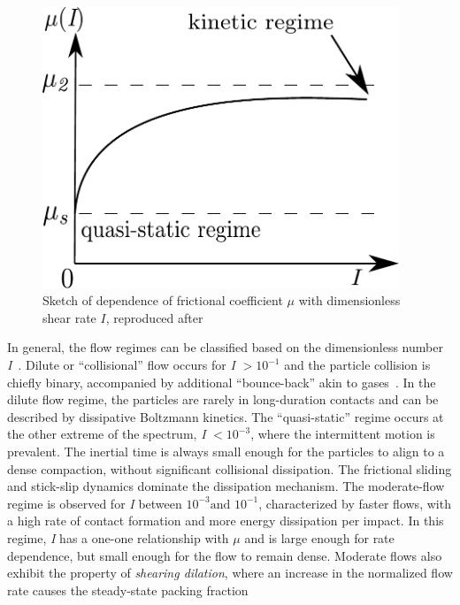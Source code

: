 \begin{figure}[htbp]
\centering
\includegraphics[width=0.95\textwidth]{mu}
\caption[Dependence of frictional coefficient $\mu$ with dimensionless shear 
rate $\textit{I}$]{Sketch of dependence of frictional coefficient $\mu$ with 
dimensionless shear rate $\textit{I}$, reproduced after ~\citet{Pouliquen2006}}
\label{fig:mu}
\end{figure}
In general, the flow regimes can be classified based on the dimensionless 
number \textit{I}~\citep{DaCruz2005}. Dilute or ``collisional'' flow occurs for 
\textit{I} $>10^{-1}$ and the particle collision is chiefly binary, 
accompanied  by additional ``bounce-back'' akin to gases~\citep{Kamrin2008}. In 
the dilute flow regime, the particles are rarely in long-duration contacts and 
can be described by dissipative Boltzmann kinetics. The ``quasi-static'' regime 
occurs at the other extreme of the spectrum, \textit{I} $<10^{-3}$, where the 
intermittent motion is prevalent. The inertial time is always small enough for 
the particles to align to a dense compaction, without significant collisional 
dissipation. The frictional sliding and stick-slip dynamics dominate the 
dissipation mechanism. The moderate-flow regime is observed for \textit{I} 
between $10^{-3} \mbox{and }10^{-1}$, characterized by faster flows, with a 
high rate of contact formation and more energy dissipation per impact. In this 
regime, \textit{I} has a one-one relationship with $\mu$ and is large enough 
for rate dependence, but small enough for the flow to remain dense. Moderate 
flows also exhibit the property of \textit{shearing dilation}, where an 
increase in the normalized flow rate causes the steady-state packing fraction 
